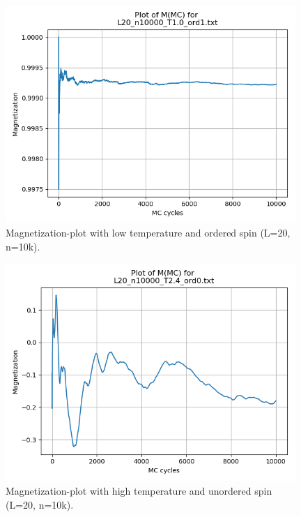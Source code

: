 \documentclass{article}
\begin{document}
    \begin{figure}[ht]
      \centering
      \includegraphics[width = 11cm]{img/magnet_L20_n10000_T10_ord1.png}
      \caption{Magnetization-plot with low temperature and ordered spin (L=20, n=10k).}
      \label{fig:L20-magnet-lowT-ord1}
    \end{figure}

    \begin{figure}[ht]
      \centering
      \includegraphics[width = 11cm]{img/magnet_L20_n10000_T24_ord0.png}
      \caption{Magnetization-plot with high temperature and unordered spin (L=20, n=10k).}
      \label{fig:L20-magnet-highT-ord0}
    \end{figure}
\end{document}
